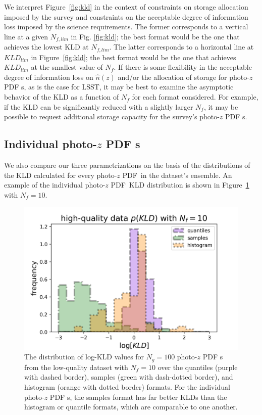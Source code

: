 \documentclass[\docopts]{\docclass}
\newcommand{\pz}{photo-$z$ PDF\xspace}
\begin{document}
We interpret Figure~\ref{fig:kld} in the context of constraints on storage 
allocation imposed by the survey and constraints on the acceptable degree of 
information loss imposed by the science requirements.
The former corresponds to a vertical line at a given $N_{f, lim}$ in Fig. 
\ref{fig:kld}; the best format would be the one that achieves the lowest KLD at 
$N_{f, lim}$.
The latter corresponds to a horizontal line at $KLD_{lim}$ in 
Figure~\ref{fig:kld}; the best format would be the one that achieves 
$KLD_{lim}$ at the smallest value of $N_{f}$.
If there is some flexibility in the acceptable degree of information loss on 
$\hat{n}(z)$ and/or the allocation of storage for \pz s, as is the case for 
LSST, it may be best to examine the asymptotic behavior of the KLD as a 
function of $N_{f}$ for each format considered.
For example, if the KLD can be significantly reduced with a slightly larger 
$N_{f}$, it may be possible to request additional storage capacity for the 
survey's \pz s.

\subsection{Individual \pz s}
\label{sec:individual_results}

We also compare our three parametrizations on the basis of the distributions of 
the KLD calculated for every \pz\ in the dataset's ensemble.
An example of the individual \pz\ KLD distribution is shown in 
Figure~\ref{fig:individual} with $N_{f}=10$.

\begin{figure}
  \includegraphics[width=0.9\columnwidth]{figures/individual.png}
  \caption{The distribution of log-KLD values for $N_{g}=100$ \pz s from the 
low-quality dataset with $N_{f}=10$ over the quantiles (purple with dashed 
border), samples (green with dash-dotted border), and histogram (orange with 
dotted border) formats.
  For the individual \pz s, the samples format has far better KLDs than the 
histogram or quantile formats, which are comparable to one another.
  \label{fig:individual}}
\end{figure}
\end{document}

